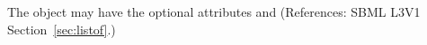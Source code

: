 The  object may have the optional attributes  and
 (References: SBML L3V1 Section~\ref{sec:listof}.)
